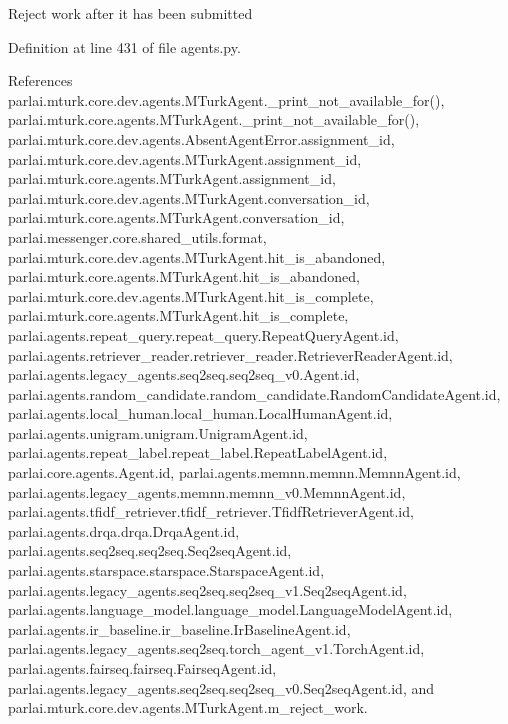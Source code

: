 \begin{DoxyVerb}Reject work after it has been submitted\end{DoxyVerb}
 

Definition at line 431 of file agents.\+py.



References parlai.\+mturk.\+core.\+dev.\+agents.\+M\+Turk\+Agent.\+\_\+print\+\_\+not\+\_\+available\+\_\+for(), parlai.\+mturk.\+core.\+agents.\+M\+Turk\+Agent.\+\_\+print\+\_\+not\+\_\+available\+\_\+for(), parlai.\+mturk.\+core.\+dev.\+agents.\+Absent\+Agent\+Error.\+assignment\+\_\+id, parlai.\+mturk.\+core.\+dev.\+agents.\+M\+Turk\+Agent.\+assignment\+\_\+id, parlai.\+mturk.\+core.\+agents.\+M\+Turk\+Agent.\+assignment\+\_\+id, parlai.\+mturk.\+core.\+dev.\+agents.\+M\+Turk\+Agent.\+conversation\+\_\+id, parlai.\+mturk.\+core.\+agents.\+M\+Turk\+Agent.\+conversation\+\_\+id, parlai.\+messenger.\+core.\+shared\+\_\+utils.\+format, parlai.\+mturk.\+core.\+dev.\+agents.\+M\+Turk\+Agent.\+hit\+\_\+is\+\_\+abandoned, parlai.\+mturk.\+core.\+agents.\+M\+Turk\+Agent.\+hit\+\_\+is\+\_\+abandoned, parlai.\+mturk.\+core.\+dev.\+agents.\+M\+Turk\+Agent.\+hit\+\_\+is\+\_\+complete, parlai.\+mturk.\+core.\+agents.\+M\+Turk\+Agent.\+hit\+\_\+is\+\_\+complete, parlai.\+agents.\+repeat\+\_\+query.\+repeat\+\_\+query.\+Repeat\+Query\+Agent.\+id, parlai.\+agents.\+retriever\+\_\+reader.\+retriever\+\_\+reader.\+Retriever\+Reader\+Agent.\+id, parlai.\+agents.\+legacy\+\_\+agents.\+seq2seq.\+seq2seq\+\_\+v0.\+Agent.\+id, parlai.\+agents.\+random\+\_\+candidate.\+random\+\_\+candidate.\+Random\+Candidate\+Agent.\+id, parlai.\+agents.\+local\+\_\+human.\+local\+\_\+human.\+Local\+Human\+Agent.\+id, parlai.\+agents.\+unigram.\+unigram.\+Unigram\+Agent.\+id, parlai.\+agents.\+repeat\+\_\+label.\+repeat\+\_\+label.\+Repeat\+Label\+Agent.\+id, parlai.\+core.\+agents.\+Agent.\+id, parlai.\+agents.\+memnn.\+memnn.\+Memnn\+Agent.\+id, parlai.\+agents.\+legacy\+\_\+agents.\+memnn.\+memnn\+\_\+v0.\+Memnn\+Agent.\+id, parlai.\+agents.\+tfidf\+\_\+retriever.\+tfidf\+\_\+retriever.\+Tfidf\+Retriever\+Agent.\+id, parlai.\+agents.\+drqa.\+drqa.\+Drqa\+Agent.\+id, parlai.\+agents.\+seq2seq.\+seq2seq.\+Seq2seq\+Agent.\+id, parlai.\+agents.\+starspace.\+starspace.\+Starspace\+Agent.\+id, parlai.\+agents.\+legacy\+\_\+agents.\+seq2seq.\+seq2seq\+\_\+v1.\+Seq2seq\+Agent.\+id, parlai.\+agents.\+language\+\_\+model.\+language\+\_\+model.\+Language\+Model\+Agent.\+id, parlai.\+agents.\+ir\+\_\+baseline.\+ir\+\_\+baseline.\+Ir\+Baseline\+Agent.\+id, parlai.\+agents.\+legacy\+\_\+agents.\+seq2seq.\+torch\+\_\+agent\+\_\+v1.\+Torch\+Agent.\+id, parlai.\+agents.\+fairseq.\+fairseq.\+Fairseq\+Agent.\+id, parlai.\+agents.\+legacy\+\_\+agents.\+seq2seq.\+seq2seq\+\_\+v0.\+Seq2seq\+Agent.\+id, and parlai.\+mturk.\+core.\+dev.\+agents.\+M\+Turk\+Agent.\+m\+\_\+reject\+\_\+work.

